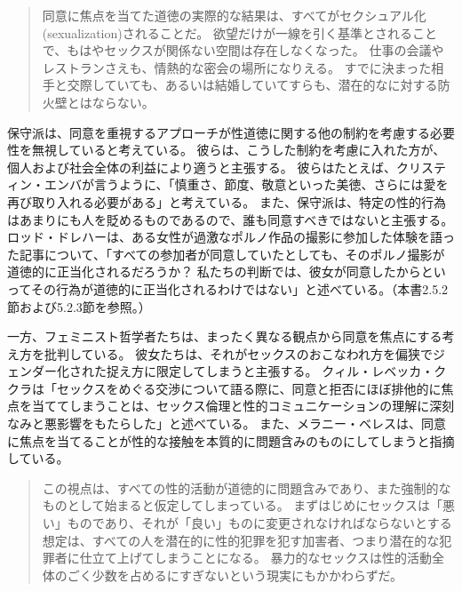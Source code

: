 \documentclass[paper=a4,book,openany]{jlreq}
\newcommand{\ig}[1]{}           %
\begin{document}
\begin{quote}
同意に焦点を当てた道徳の実際的な結果は、すべてがセクシュアル化(sexualization)されることだ。
欲望だけが一線を引く基準とされることで、もはやセックスが関係ない空間は存在しなくなった。
仕事の会議やレストランさえも、情熱的な密会の場所になりえる。
すでに決まった相手と交際していても、あるいは結婚していてすらも、潜在的なに対する防火壁とはならない。
\citep{french17:_its_past_time}
\end{quote}

保守派は、同意を重視するアプローチが性道徳に関する他の制約を考慮する必要性を無視していると考えている。
彼らは、こうした制約を考慮に入れた方が、個人および社会全体の利益により適うと主張する。
彼らはたとえば、クリスティン・エンバが言うように、「慎重さ、節度、敬意といった美徳、さらには愛を再び取り入れる必要がある」と考えている\citep{emba17:_lets_rethin_sex}。
また、保守派は、特定の性的行為はあまりにも人を貶めるものであるので、誰も同意すべきではないと主張する。
ロッド・ドレハー\ig{Rod Dreher}は、ある女性が過激なポルノ作品の撮影に参加した体験を語った記事について、「すべての参加者が同意していたとしても、そのポルノ撮影が道徳的に正当化されるだろうか？ 私たちの判断では、彼女が同意したからといってその行為が道徳的に正当化されるわけではない」と述べている\citep{dreher13:_porn_cultur_consen}。（本書2.5.2節および5.2.3節を参照。）

一方、フェミニスト哲学者たちは、まったく異なる観点から同意を焦点にする考え方を批判している。
彼女たちは、それがセックスのおこなわれ方を偏狭でジェンダー化された捉え方に限定してしまうと主張する。
クィル・レベッカ・ククラは「セックスをめぐる交渉について語る際に、同意と拒否にほぼ排他的に焦点を当ててしまうことは、セックス倫理と性的コミュニケーションの理解に深刻なみと悪影響をもたらした」と述べている\citep[p.75]{kukla18:_thats_what_she_said}。
また、メラニー・ベレスは、同意に焦点を当てることが性的な接触を本質的に問題含みのものにしてしまうと指摘している。

\begin{quote}
この視点は、すべての性的活動が道徳的に問題含みであり、また強制的なものとして始まると仮定してしまっている。
まずはじめにセックスは「悪い」ものであり、それが「良い」ものに変更されなければならないとする想定は、すべての人を潜在的に性的犯罪を犯す加害者、つまり潜在的な犯罪者に仕立て上げてしまうことになる。
暴力的なセックスは性的活動全体のごく少数を占めるにすぎないという現実にもかかわらずだ。
\citep[p.102]{beres07:_spont_sexual_consen}
\end{quote}
\end{document}
